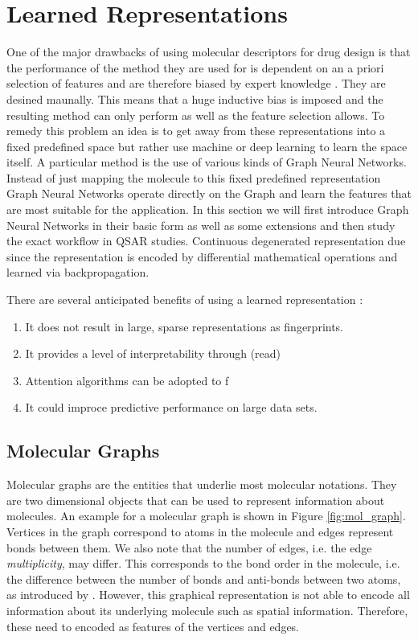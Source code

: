 \section{Learned Representations}
One of the major drawbacks of using molecular descriptors for drug design is that the performance of the method they are used for is dependent on an a priori selection of features and are therefore biased by expert knowledge \cite{merkwirth}. They are desined maunally. This means that a huge inductive bias is imposed and the resulting method can only perform as well as the feature selection allows. To remedy this problem an idea is to get away from these representations into a fixed predefined space but rather use machine or deep learning to learn the space itself. A particular method is the use of various kinds of Graph Neural Networks. Instead of just mapping the molecule to this fixed predefined representation Graph Neural Networks operate directly on the Graph and learn the features that are most suitable for the application. In this section we will first introduce Graph Neural Networks in their basic form as well as some extensions and then study the exact workflow in QSAR studies. Continuous degenerated representation due since the representation is encoded by differential mathematical operations and learned via backpropagation.

There are several anticipated benefits of using a learned representation \citep{SHEN201929}:
\begin{enumerate}
	\item It does not result in large, sparse representations as fingerprints.
	\item It provides a level of interpretability through \citep{duvenaud2015convolutional} (read)
	\item Attention algorithms can be adopted to f \citep{deepchemstable, graphattentionmpp}
	\item It could improce predictive performance on large data sets. \citep{yangMPP}
\end{enumerate}

\subsection{Molecular Graphs}
\label{sec:mol_graphs}
Molecular graphs are the entities that underlie most molecular notations. They are two dimensional objects that can be used to represent information about molecules. An example for a molecular graph is shown in Figure \ref{fig:mol_graph}. Vertices in the graph correspond to atoms in the molecule and edges represent bonds between them. We also note that the number of edges, i.e. the edge \emph{multiplicity}, may differ. This corresponds to the bond order in the molecule, i.e. the difference between the number of bonds and anti-bonds between two atoms, as introduced by \cite{pauling}. However, this graphical representation is not able to encode all information about its underlying molecule such as spatial information. Therefore, these need to encoded as features of the vertices and edges.


